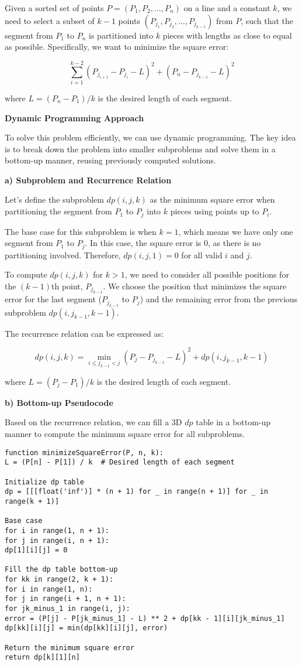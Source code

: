 \documentclass{article}
\begin{document}
Given a sorted set of points $P = (P_1, P_2, \ldots, P_n)$ on a line and a constant $k$, we need to select a subset of $k-1$ points $(P_{j_1}, P_{j_2}, \ldots, P_{j_{k-1}})$ from $P$, such that the segment from $P_1$ to $P_n$ is partitioned into $k$ pieces with lengths as close to equal as possible. Specifically, we want to minimize the square error:

$$
\sum_{i=1}^{k-2} (P_{j_{i+1}} - P_{j_i} - L)^2 + (P_n - P_{j_{k-1}} - L)^2
$$

where $L = (P_n - P_1) / k$ is the desired length of each segment.

\textbf{Dynamic Programming Approach}

To solve this problem efficiently, we can use dynamic programming. The key idea is to break down the problem into smaller subproblems and solve them in a bottom-up manner, reusing previously computed solutions.

\textbf{a) Subproblem and Recurrence Relation}

Let's define the subproblem $dp(i, j, k)$ as the minimum square error when partitioning the segment from $P_1$ to $P_j$ into $k$ pieces using points up to $P_i$.

The base case for this subproblem is when $k = 1$, which means we have only one segment from $P_1$ to $P_j$. In this case, the square error is 0, as there is no partitioning involved. Therefore, $dp(i, j, 1) = 0$ for all valid $i$ and $j$.

To compute $dp(i, j, k)$ for $k > 1$, we need to consider all possible positions for the $(k-1)$th point, $P_{j_{k-1}}$. We choose the position that minimizes the square error for the last segment ($P_{j_{k-1}}$ to $P_j$) and the remaining error from the previous subproblem $dp(i, j_{k-1}, k-1)$.

The recurrence relation can be expressed as:

$$
dp(i, j, k) = \min_{i \leq j_{k-1} < j} {(P_j - P_{j_{k-1}} - L)^2 + dp(i, j_{k-1}, k-1)}
$$

where $L = (P_j - P_1) / k$ is the desired length of each segment.

\textbf{b) Bottom-up Pseudocode}

Based on the recurrence relation, we can fill a 3D $dp$ table in a bottom-up manner to compute the minimum square error for all subproblems.

\begin{verbatim}
function minimizeSquareError(P, n, k):
L = (P[n] - P[1]) / k  # Desired length of each segment

Initialize dp table
dp = [[[float('inf')] * (n + 1) for _ in range(n + 1)] for _ in range(k + 1)]

Base case
for i in range(1, n + 1):
for j in range(i, n + 1):
dp[1][i][j] = 0

Fill the dp table bottom-up
for kk in range(2, k + 1):
for i in range(1, n):
for j in range(i + 1, n + 1):
for jk_minus_1 in range(i, j):
error = (P[j] - P[jk_minus_1] - L) ** 2 + dp[kk - 1][i][jk_minus_1]
dp[kk][i][j] = min(dp[kk][i][j], error)

Return the minimum square error
return dp[k][1][n]
\end{verbatim}
\end{document}

